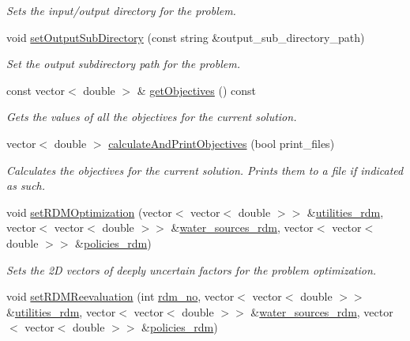 \begin{DoxyCompactItemize}
\begin{DoxyCompactList}\small\item\em Sets the input/output directory for the problem. \end{DoxyCompactList}\item 
void \mbox{\hyperlink{classProblem_a5b0d5309406eb36a594836e5004e3be6}{set\+Output\+Sub\+Directory}} (const string \&output\+\_\+sub\+\_\+directory\+\_\+path)
\begin{DoxyCompactList}\small\item\em Set the output subdirectory path for the problem. \end{DoxyCompactList}\item 
const vector$<$ double $>$ \& \mbox{\hyperlink{classProblem_a64ffd22f18e26eba34013c81dc106212}{get\+Objectives}} () const
\begin{DoxyCompactList}\small\item\em Gets the values of all the objectives for the current solution. \end{DoxyCompactList}\item 
vector$<$ double $>$ \mbox{\hyperlink{classProblem_a195a32a960235513064a089c2472b44f}{calculate\+And\+Print\+Objectives}} (bool print\+\_\+files)
\begin{DoxyCompactList}\small\item\em Calculates the objectives for the current solution. Prints them to a file if indicated as such. \end{DoxyCompactList}\item 
void \mbox{\hyperlink{classProblem_a98115002e741e9220f7aa6bae0cb179c}{set\+R\+D\+M\+Optimization}} (vector$<$ vector$<$ double $>$$>$ \&\mbox{\hyperlink{classProblem_aa4f6db22580c8d8a941e83556f4f5208}{utilities\+\_\+rdm}}, vector$<$ vector$<$ double $>$$>$ \&\mbox{\hyperlink{classProblem_ace43e5306285f0d91a199a4bd5a38922}{water\+\_\+sources\+\_\+rdm}}, vector$<$ vector$<$ double $>$$>$ \&\mbox{\hyperlink{classProblem_a63d49161a5d6d98e26cd218d90a13bae}{policies\+\_\+rdm}})
\begin{DoxyCompactList}\small\item\em Sets the 2D vectors of deeply uncertain factors for the problem optimization. \end{DoxyCompactList}\item 
void \mbox{\hyperlink{classProblem_ac4d39cf1e998e07b46b4a25fe9a1bb45}{set\+R\+D\+M\+Reevaluation}} (int \mbox{\hyperlink{classProblem_a8e1d46a8dca514e4973b00a038480fc2}{rdm\+\_\+no}}, vector$<$ vector$<$ double $>$$>$ \&\mbox{\hyperlink{classProblem_aa4f6db22580c8d8a941e83556f4f5208}{utilities\+\_\+rdm}}, vector$<$ vector$<$ double $>$$>$ \&\mbox{\hyperlink{classProblem_ace43e5306285f0d91a199a4bd5a38922}{water\+\_\+sources\+\_\+rdm}}, vector$<$ vector$<$ double $>$$>$ \&\mbox{\hyperlink{classProblem_a63d49161a5d6d98e26cd218d90a13bae}{policies\+\_\+rdm}})

\end{DoxyCompactItemize}
